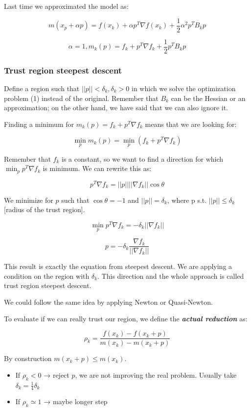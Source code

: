 Last time we approximated the model as:

$$
m(x_p+\alpha p)=f(x_k)+\alpha p^T \nabla f(x_k)+ \frac{1}{2} \alpha^2p^T B_k p
$$

$$
\alpha=1, m_k (p)=f_k+p^T\nabla f_k + \frac{1}{2} p^T B_k p
$$

\hypertarget{trust-region-steepest-descent}{%
\subsubsection{Trust region steepest
descent}\label{trust-region-steepest-descent}}

Define a region such that $||p|| < \delta_k,\delta_k>0$ in which we
solve the optimization problem (1) instead of the original. Remember
that $B_k$ can be the Hessian or an approximation; on the other hand, we
have said that we can also ignore it.

Finding a minimum for $m_k(p)=f_k+p^T\nabla f_k$ means that we are
looking for:

$$
\min_p m_k(p)= \min_p (f_k+p^T\nabla f_k)
$$

Remember that $f_k$ is a constant, so we want to find a direction for
which $\min_p p^T\nabla f_k$ is minimum. We can rewrite this as:

$$
p^T\nabla f_k = ||p|| ||\nabla f_k|| \cos \theta
$$

We minimize for $p$ such that $\cos \theta = -1$ and $||p||=\delta_k$,
where p s.t. $||p|| \leq \delta_k$ {[}radius of the trust region{]}.

$$
\min_p p^T\nabla f_k = -\delta_k || \nabla f_k ||
$$

$$
p = - \delta_k \frac{\nabla f_k}{||\nabla f_k||}
$$

This result is exactly the equation from steepest descent. We are
applying a condition on the region with $\delta_k$. This direction and
the whole approach is called trust region steepest descent.

We could follow the same idea by applying Newton or Quasi-Newton.

To evaluate if we can really trust our region, we define the
\textbf{\emph{actual reduction}} as:

$$
\rho_k = \frac{f(x_k)-f(x_k+p)}{m(x_k)-m(x_k+p)}
$$

By construction $m(x_k+p) \leq m(x_k)$.

\begin{itemize}
\tightlist
\item
  If $\rho_k < 0$ → reject $p$, we are not improving the real problem.
  Usually take $\delta_k = \frac{1}{4} \delta_k$
\item
  If $\rho_k \simeq 1$ → maybe longer step
\end{itemize}


